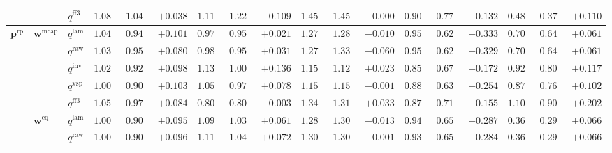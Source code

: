 \documentclass[eng]{kjas3}
\begin{document}
\begin{table}[t]
{\begin{tabular}{lll ccc ccc ccc ccc ccc}
 &  & $q^{\mathrm{ff3}}$ & $1.081$ & $1.043$ & \cellcolor{posgreen!50}$+0.038$ & $1.116$ & $1.225$ & \cellcolor{negred!50}$-0.109$ & $1.453$ & $1.454$ & $-0.000$ & $0.908$ & $0.776$ & \cellcolor{posgreen!50}$+0.132$ & $0.484$ & $0.374$ & \cellcolor{posgreen!50}$+0.110$ \\
\midrule
$\mathbf{p}^{\mathrm{rp}}$ & $\mathbf{w}^{\mathrm{mcap}}$ & $q^{\mathrm{lam}}$ & $1.042$ & $0.940$ & \cellcolor{posgreen!50}$+0.101$ & $0.977$ & $0.956$ & \cellcolor{posgreen!50}$+0.021$ & $1.275$ & $1.285$ & \cellcolor{negred!50}$-0.010$ & $0.953$ & $0.620$ & \cellcolor{posgreen!50}$+0.333$ & $0.709$ & $0.647$ & \cellcolor{posgreen!50}$+0.061$ \\
 &  & $q^{\mathrm{raw}}$ & $1.036$ & $0.956$ & \cellcolor{posgreen!50}$+0.080$ & $0.986$ & $0.955$ & \cellcolor{posgreen!50}$+0.031$ & $1.270$ & $1.330$ & \cellcolor{negred!50}$-0.060$ & $0.951$ & $0.621$ & \cellcolor{posgreen!50}$+0.329$ & $0.709$ & $0.647$ & \cellcolor{posgreen!50}$+0.061$ \\
 &  & $q^{\mathrm{inv}}$ & $1.020$ & $0.922$ & \cellcolor{posgreen!50}$+0.098$ & $1.137$ & $1.001$ & \cellcolor{posgreen!50}$+0.136$ & $1.151$ & $1.129$ & \cellcolor{posgreen!50}$+0.023$ & $0.852$ & $0.679$ & \cellcolor{posgreen!50}$+0.172$ & $0.926$ & $0.808$ & \cellcolor{posgreen!50}$+0.117$ \\
 &  & $q^{\mathrm{vsp}}$ & $1.009$ & $0.906$ & \cellcolor{posgreen!50}$+0.103$ & $1.055$ & $0.977$ & \cellcolor{posgreen!50}$+0.078$ & $1.150$ & $1.151$ & \cellcolor{negred!50}$-0.001$ & $0.884$ & $0.631$ & \cellcolor{posgreen!50}$+0.254$ & $0.871$ & $0.769$ & \cellcolor{posgreen!50}$+0.102$ \\
 &  & $q^{\mathrm{ff3}}$ & $1.054$ & $0.970$ & \cellcolor{posgreen!50}$+0.084$ & $0.806$ & $0.809$ & \cellcolor{negred!50}$-0.003$ & $1.344$ & $1.311$ & \cellcolor{posgreen!50}$+0.033$ & $0.870$ & $0.714$ & \cellcolor{posgreen!50}$+0.155$ & $1.102$ & $0.900$ & \cellcolor{posgreen!50}$+0.202$ \\
\cmidrule(lr){2-18}
 & $\mathbf{w}^{\mathrm{eq}}$ & $q^{\mathrm{lam}}$ & $1.003$ & $0.908$ & \cellcolor{posgreen!50}$+0.095$ & $1.098$ & $1.038$ & \cellcolor{posgreen!50}$+0.061$ & $1.289$ & $1.302$ & \cellcolor{negred!50}$-0.013$ & $0.941$ & $0.654$ & \cellcolor{posgreen!50}$+0.287$ & $0.363$ & $0.297$ & \cellcolor{posgreen!50}$+0.066$ \\
 &  & $q^{\mathrm{raw}}$ & $1.005$ & $0.909$ & \cellcolor{posgreen!50}$+0.096$ & $1.114$ & $1.042$ & \cellcolor{posgreen!50}$+0.072$ & $1.306$ & $1.307$ & \cellcolor{negred!50}$-0.001$ & $0.938$ & $0.654$ & \cellcolor{posgreen!50}$+0.284$ & $0.363$ & $0.297$ & \cellcolor{posgreen!50}$+0.066$ \\

\end{tabular}}
\end{table}
\end{document}
